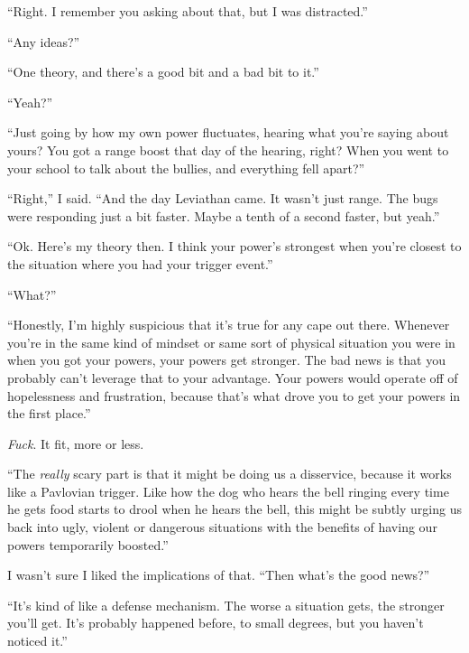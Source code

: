 ``Right.  I remember you asking about that, but I was distracted.''



``Any ideas?''



``One theory, and there's a good bit and a bad bit to it.''



``Yeah?''



``Just going by how my own power fluctuates, hearing what you're saying about yours?  You got a range boost that day of the hearing, right?  When you went to your school to talk about the bullies, and everything fell apart?''



``Right,'' I said.  ``And the day Leviathan came.  It wasn't just range.  The bugs were responding just a bit faster.  Maybe a tenth of a second faster, but yeah.''



``Ok.  Here's my theory then.  I think your power's strongest when you're closest to the situation where you had your trigger event.''



``What?''



``Honestly, I'm highly suspicious that it's true for any cape out there.  Whenever you're in the same kind of mindset or same sort of physical situation you were in when you got your powers, your powers get stronger.  The bad news is that you probably can't leverage that to your advantage.  Your powers would operate off of hopelessness and frustration, because that's what drove you to get your powers in the first place.''



\emph{Fuck}.  It fit, more or less.



``The \emph{really} scary part is that it might be doing us a disservice, because it works like a Pavlovian trigger.  Like how the dog who hears the bell ringing every time he gets food starts to drool when he hears the bell, this might be subtly urging us back into ugly, violent or dangerous situations with the benefits of having our powers temporarily boosted.''



I wasn't sure I liked the implications of that.  ``Then what's the good news?''



``It's kind of like a defense mechanism.  The worse a situation gets, the stronger you'll get.  It's probably happened before, to small degrees, but you haven't noticed it.''



